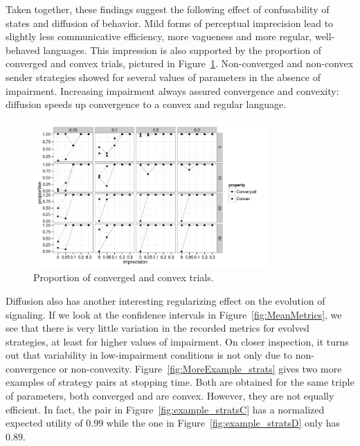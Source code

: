 Taken together, these findings suggest the following effect of
confusability of states and diffusion of behavior. Mild forms of
perceptual imprecision lead to slightly less communicative efficiency,
more vagueness and more regular, well-behaved languages. This
impression is also supported by the proportion of converged and convex
trials, pictured in
Figure~\ref{fig:CategoricalMeasures}. Non-converged and non-convex
sender strategies showed for several values of parameters in the
absence of impairment. Increasing impairment always assured
convergence and convexity: diffusion speeds up convergence to a convex
and regular language.

\begin{figure}
  \centering
  
  \includegraphics[width=0.8\textwidth]{plots/CategoricalMeasures.pdf}

  \caption{Proportion of converged and convex trials.}
  \label{fig:CategoricalMeasures}
\end{figure}

Diffusion also has another interesting regularizing effect on the
evolution of signaling. If we look at the confidence intervals in
Figure~\ref{fig:MeanMetrics}, we see that there is very little
variation in the recorded metrics for evolved strategies, at least for
higher values of impairment. On closer inspection, it turns out that
variability in low-impairment conditions is not only due to
non-convergence or non-convexity. Figure~\ref{fig:MoreExample_strats}
gives two more examples of strategy pairs at stopping time. Both are
obtained for the same triple of parameters, both converged and are
convex. However, they are not equally efficient. In fact, the pair in
Figure~\ref{fig:example_stratsC} has a normalized expected utility of
$0.99$ while the one in Figure~\ref{fig:example_stratsD} only has
$0.89$.


